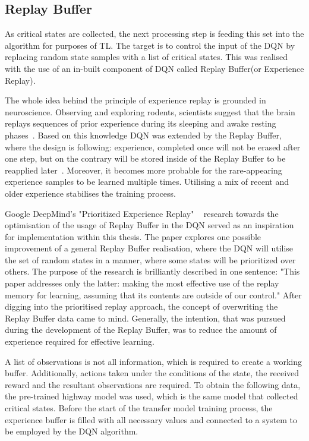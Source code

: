 \subsection{Replay Buffer}\label{sec:replay_buffer}

As critical states are collected, the next processing step is feeding this set into the algorithm for purposes of TL. The target is to control the input of the DQN by replacing random state samples with a list of critical states. This was realised with the use of an in-built component of DQN called Replay Buffer(or Experience Replay).

The whole idea behind the principle of experience replay is grounded in neuroscience. Observing and exploring rodents, scientists suggest that the brain replays sequences of prior experience during its sleeping and awake resting phases~\cite{Foster2006}. Based on this knowledge DQN was extended by the Replay Buffer, where the design is following: experience, completed once will not be erased after one step, but on the contrary will be stored inside of the Replay Buffer to be reapplied later~\cite{schaul2016prioritizedexperiencereplay}. Moreover, it becomes more probable for the rare-appearing experience samples to be learned multiple times. Utilising a mix of recent and older experience stabilises the training process.

Google DeepMind's "Prioritized Experience Replay" ~\cite{schaul2016prioritizedexperiencereplay} research towards the optimisation of the usage of Replay Buffer in the DQN served as an inspiration for implementation within this thesis. The paper explores one possible improvement of a general Replay Buffer realisation, where the DQN will utilise the set of random states in a manner, where some states will be prioritized over others. The purpose of the research is brilliantly described in one sentence: "This paper addresses only the latter: making the most effective use of the replay memory for learning, assuming that its contents are outside of our control." After digging into the prioritised replay approach, the concept of overwriting the Replay Buffer data came to mind. Generally, the intention, that was pursued during the development of the Replay Buffer, was to reduce the amount of experience required for effective learning.

A list of observations is not all information, which is required to create a working buffer. Additionally, actions taken under the conditions of the state, the received reward and the resultant observations are required. To obtain the following data, the pre-trained highway model was used, which is the same model that collected critical states. Before the start of the transfer model training process, the experience buffer is filled with all necessary values and connected to a system to be employed by the DQN algorithm.
